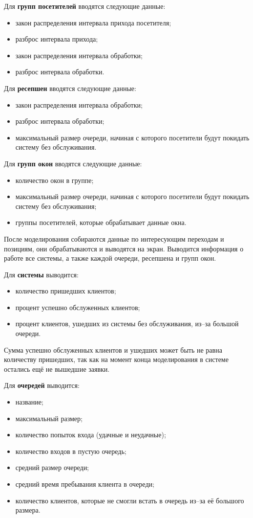 Для \textbf{групп посетителей} вводятся следующие данные: 
\begin{itemize}[label=---]
	\item закон распределения интервала прихода посетителя;
	\item разброс интервала прихода;
	\item закон распределения интервала обработки;
	\item разброс интервала обработки.
\end{itemize}

Для \textbf{ресепшен} вводятся следующие данные: 
\begin{itemize}[label=---]
	\item закон распределения интервала обработки;
	\item разброс интервала обработки;
	\item максимальный размер очереди, начиная с которого посетители будут покидать систему без обслуживания.
\end{itemize}

Для \textbf{групп окон} вводятся следующие данные: 
\begin{itemize}[label=---]
	\item количество окон в группе;
	\item максимальный размер очереди, начиная с которого посетители будут покидать систему без обслуживания;
	\item группы посетителей, которые обрабатывает данные окна.
\end{itemize}

После моделирования собираются данные по интересующим переходам и позициям, они обрабатываются и выводятся на экран. Выводится информация о работе все системы, а также каждой очереди, ресепшена и групп окон.

Для \textbf{системы} выводится:
\begin{itemize}[label=---]
	\item количество пришедших клиентов;
	\item процент успешно обслуженных клиентов;
	\item процент клиентов, ушедших из системы без обслуживания, из--за большой очереди.
\end{itemize}
Сумма успешно обслуженных клиентов и ушедших может быть не равна количеству пришедших, так как на момент конца моделирования в системе остались ещё не вышедшие заявки.

Для \textbf{очередей} выводится:
\begin{itemize}[label=---]
	\item название;
	\item максимальный размер;
	\item количество попыток входа (удачные и неудачные);
	\item количество входов в пустую очередь;
	\item средний размер очереди;
	\item средний время пребывания клиента в очереди;
	\item количество клиентов, которые не смогли встать в очередь из--за её большого размера.
\end{itemize}

